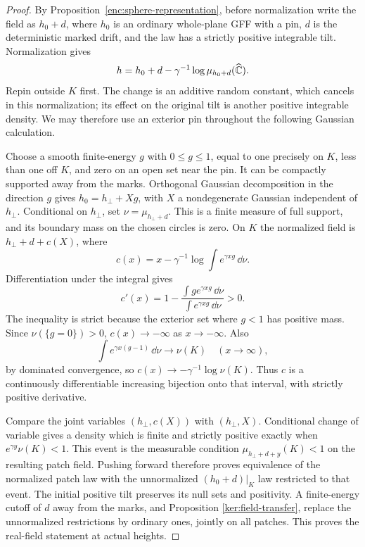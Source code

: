 \begin{proof}
By Proposition~\ref{enc:sphere-representation}, before normalization
write the field as \(h_0+d\), where \(h_0\) is an ordinary whole-plane
GFF with a pin, \(d\) is the deterministic marked drift, and the law
has a strictly positive integrable tilt.  Normalization gives
\[
 h=h_0+d-\gamma^{-1}\log\mu_{h_0+d}(\widehat{\mathbb C}).
\]
Repin outside \(K\) first.  The change is an additive random constant,
which cancels in this normalization; its effect on the original tilt
is another positive integrable density.  We may therefore use an
exterior pin throughout the following Gaussian calculation.

Choose a smooth finite-energy \(g\) with \(0\le g\le1\), equal to
one precisely on \(K\), less than one off \(K\), and zero on an
open set near the pin.  It can be compactly supported away from the
marks.  Orthogonal Gaussian decomposition in the direction \(g\)
gives \(h_0=h_\perp+Xg\), with \(X\) a nondegenerate Gaussian
independent of \(h_\perp\).  Conditional on \(h_\perp\), set
\(\nu=\mu_{h_\perp+d}\).  This is a finite measure of full support,
and its boundary mass on the chosen circles is zero.  On \(K\) the
normalized field is \(h_\perp+d+c(X)\), where
\[
 c(x)=x-\gamma^{-1}\log\int e^{\gamma xg}\,\dd\nu.
\]
Differentiation under the integral gives
\[
 c'(x)=1-
 \frac{\int g e^{\gamma xg}\,\dd\nu}
      {\int e^{\gamma xg}\,\dd\nu}>0.
\]
The inequality is strict because the exterior set where \(g<1\)
has positive mass.  Since \(\nu(\{g=0\})>0\), \(c(x)\to-\infty\)
as \(x\to-\infty\).  Also
\[
 \int e^{\gamma x(g-1)}\,\dd\nu\longrightarrow\nu(K)
 \quad(x\to\infty),
\]
by dominated convergence, so
\(c(x)\to-\gamma^{-1}\log\nu(K)\).
Thus \(c\) is a continuously differentiable increasing bijection
onto that interval, with strictly positive derivative.

Compare the joint variables \((h_\perp,c(X))\) with
\((h_\perp,X)\).  Conditional change of variable gives a density
which is finite and strictly positive exactly when
\(e^{\gamma y}\nu(K)<1\).  This event is the measurable condition
\(\mu_{h_\perp+d+y}(K)<1\) on the resulting patch field.  Pushing
forward therefore proves equivalence of the normalized patch law
with the unnormalized \((h_0+d)|_K\) law restricted to that event.
The initial positive tilt preserves its null sets and positivity.
A finite-energy cutoff of \(d\) away from the marks, and Proposition
\ref{ker:field-transfer}, replace the unnormalized restrictions by
ordinary ones, jointly on all patches.  This proves the real-field
statement at actual heights.


\end{proof}
